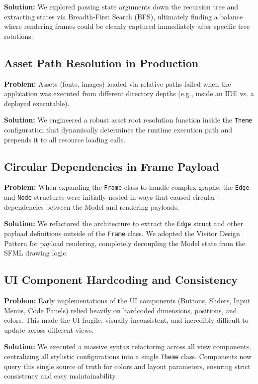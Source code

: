 \textbf{Solution:} We explored passing state arguments down the recursion tree and extracting states via Breadth-First Search (BFS), ultimately finding a balance where rendering frames could be cleanly captured immediately after specific tree rotations.

\subsection{Asset Path Resolution in Production}
\textbf{Problem:} Assets (fonts, images) loaded via relative paths failed when the application was executed from different directory depths (e.g., inside an IDE vs. a deployed executable).

\textbf{Solution:} We engineered a robust asset root resolution function inside the \texttt{Theme} configuration that dynamically determines the runtime execution path and prepends it to all resource loading calls.

\subsection{Circular Dependencies in Frame Payload}
\textbf{Problem:} When expanding the \texttt{Frame} class to handle complex graphs, the \texttt{Edge} and \texttt{Node} structures were initially nested in ways that caused circular dependencies between the Model and rendering payloads.

\textbf{Solution:} We refactored the architecture to extract the \texttt{Edge} struct and other payload definitions outside of the \texttt{Frame} class. We adopted the Visitor Design Pattern for payload rendering, completely decoupling the Model state from the SFML drawing logic.

\subsection{UI Component Hardcoding and Consistency}
\textbf{Problem:} Early implementations of the UI components (Buttons, Sliders, Input Menus, Code Panels) relied heavily on hardcoded dimensions, positions, and colors. This made the UI fragile, visually inconsistent, and incredibly difficult to update across different views.

\textbf{Solution:} We executed a massive syntax refactoring across all view components, centralizing all stylistic configurations into a single \texttt{Theme} class. Components now query this single source of truth for colors and layout parameters, ensuring strict consistency and easy maintainability.

